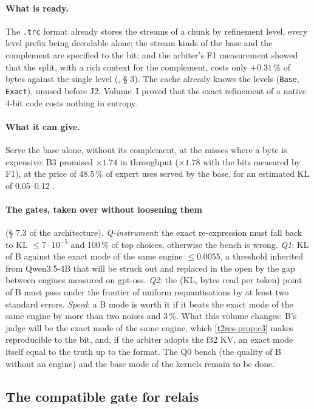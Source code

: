 \paragraph{What is ready.} The \texttt{.trc} format already stores the streams of a chunk by refinement level, every level prefix being decodable alone; the stream kinds of the base and the complement are specified to the bit; and the arbiter's F1 measurement showed that the split, with a rich context for the complement, costs only $+0.31\,\%$ of bytes against the single level (, § 3). The cache already knows the levels (\texttt{Base}, \texttt{Exact}), unused before J2. Volume~I proved that the exact refinement of a native 4-bit code costs nothing in entropy.

\paragraph{What it can give.} Serve the base alone, without its complement, at the misses where a byte is expensive: B3 promised $\times 1.74$ in throughput ($\times 1.78$ with the bits measured by F1), at the price of \num{48.5}\,\% of expert uses served by the base, for an estimated KL of \numrange{0.05}{0.12} \calc.

\paragraph{The gates, taken over without loosening them} (§ 7.3 of the architecture). \emph{Q-instrument}: the exact re-expression must fall back to KL $\le 7\cdot10^{-5}$ and \num{100}\,\% of top choices, otherwise the bench is wrong. \emph{Q1}: KL of B against the exact mode of the same engine $\le \num{0.0055}$, a threshold inherited from Qwen3.5-4B that will be struck out and replaced in the open by the gap between engines measured on gpt-oss. \emph{Q2}: the (KL, bytes read per token) point of B must pass under the frontier of uniform requantisations by at least two standard errors. \emph{Speed}: a B mode is worth it if it beats the exact mode of the same engine by more than two noises and 3\,\%. What this volume changes: B's judge will be the exact mode of the same engine, which \cref{t2res-prop:c3} makes reproducible to the bit, and, if the arbiter adopts the f32 KV, an exact mode itself equal to the truth up to the format. The Q0 bench (the quality of B without an engine) and the base mode of the kernels remain to be done.

\subsection{The compatible gate for relais}\label{t2d-sec:relais}

